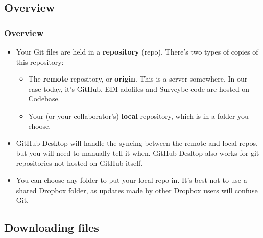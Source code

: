 \documentclass{beamer}
\begin{document}
\subsection{Overview}
\begin{frame}
\frametitle{Overview}
	\begin{itemize}
		\item Your Git files are held in a \textbf{repository} (repo). There's two types of copies of this repository:
		\begin{itemize}
			\item The \textbf{remote} repository, or \textbf{origin}. This is a server somewhere. In our case today, it's GitHub. EDI adofiles and Surveybe code are hosted on Codebase.
			\item Your (or your collaborator's) \textbf{local} repository, which is in a folder you choose.
		\end{itemize}
		\item GitHub Desktop will handle the syncing between the remote and local repos, but you will need to manually tell it when. GitHub Desltop also works for git repositories not hosted on GitHub itself.
		\item You can choose any folder to put your local repo in. It's best not to use a shared 
				Dropbox folder, as updates made by other Dropbox users will confuse Git.	
	\end{itemize}
\end{frame}

\subsection{Downloading files}
\end{document}
